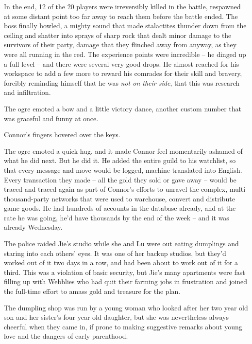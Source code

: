 In the end, 12 of the 20 players were irreversibly killed in the
battle, respawned at some distant point too far away to reach them
before the battle ended. The boss finally howled, a mighty sound
that made stalactites thunder down from the ceiling and shatter
into sprays of sharp rock that dealt minor damage to the survivors
of their party, damage that they flinched away from anyway, as they
were all running in the red. The experience points were incredible
-- he dinged up a full level -- and there were several very good
drops. He almost reached for his workspace to add a few more to
reward his comrades for their skill and bravery, forcibly reminding
himself that he was \emph{not on their side}, that this was
research and infiltration.


The ogre emoted a bow and a little victory dance, another custom
number that was graceful and funny at once.


Connor's fingers hovered over the keys.


The ogre emoted a quick hug, and it made Connor feel momentarily
ashamed of what he did next. But he did it. He added the entire
guild to his watchlist, so that every message and move would be
logged, machine-translated into English. Every transaction they
made -- all the gold they sold or gave away -- would be traced and
traced again as part of Connor's efforts to unravel the complex,
multi-thousand-party networks that were used to warehouse, convert
and distribute game-goods. He had hundreds of accounts in the
database already, and at the rate he was going, he'd have thousands
by the end of the week -- and it was already Wednesday.

\tb

The police raided Jie's studio while she and Lu were out eating
dumplings and staring into each others' eyes. It was one of her
backup studios, but they'd worked out of it two days in a row, and
had been about to work out of it for a third. This was a violation
of basic security, but Jie's many apartments were fast filling up
with Webblies who had quit their farming jobs in frustration and
joined the full-time effort to amass gold and treasure for the
plan.

The dumpling shop was run by a young woman who looked after her two
year old son and her sister's four year old daughter, but she was
nevertheless always cheerful when they came in, if prone to making
suggestive remarks about young love and the dangers of early
parenthood.


